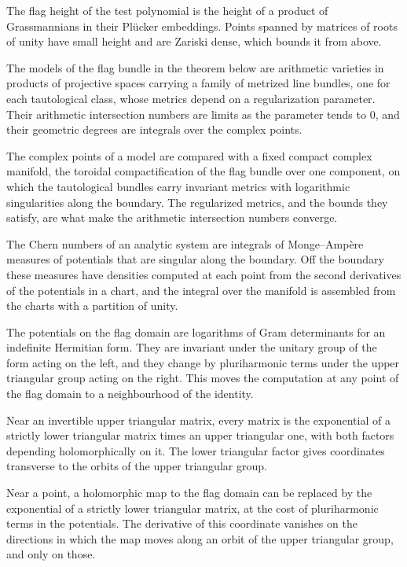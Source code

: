 The flag height of the test polynomial is the height of a product of Grassmannians in their
Plücker embeddings. Points spanned by matrices of roots of unity have small height and are Zariski
dense, which bounds it from above.

The models of the flag bundle in the theorem below are arithmetic varieties in products of
projective spaces carrying a family of metrized line bundles, one for each tautological class, whose
metrics depend on a regularization parameter. Their arithmetic intersection numbers are limits as
the parameter tends to $0$, and their geometric degrees are integrals over the complex points.

The complex points of a model are compared with a fixed compact complex manifold, the toroidal
compactification of the flag bundle over one component, on which the tautological bundles carry
invariant metrics with logarithmic singularities along the boundary. The regularized metrics, and
the bounds they satisfy, are what make the arithmetic intersection numbers converge.

The Chern numbers of an analytic system are integrals of Monge--Amp\`ere measures of potentials
that are singular along the boundary. Off the boundary these measures have densities computed at
each point from the second derivatives of the potentials in a chart, and the integral over the
manifold is assembled from the charts with a partition of unity.

The potentials on the flag domain are logarithms of Gram determinants for an indefinite Hermitian
form. They are invariant under the unitary group of the form acting on the left, and they change by
pluriharmonic terms under the upper triangular group acting on the right. This moves the
computation at any point of the flag domain to a neighbourhood of the identity.

Near an invertible upper triangular matrix, every matrix is the exponential of a strictly lower
triangular matrix times an upper triangular one, with both factors depending holomorphically on
it. The lower triangular factor gives coordinates transverse to the orbits of the upper triangular
group.

Near a point, a holomorphic map to the flag domain can be replaced by the exponential of a strictly
lower triangular matrix, at the cost of pluriharmonic terms in the potentials. The derivative of
this coordinate vanishes on the directions in which the map moves along an orbit of the upper
triangular group, and only on those.

